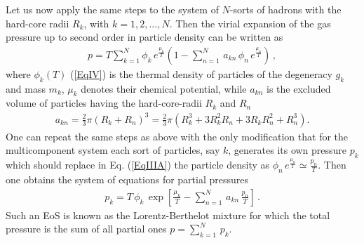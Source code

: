 \documentclass[12pt]{article}
\begin{document}
Let us  now apply the same steps  to the system of $N$-sorts  of  hadrons  with  the hard-core radii $R_k$, with $k = 1, 2, ..., N$. Then the virial expansion of the gas pressure  up to second order in particle density  can be written as
%
\begin{eqnarray}\label{EqIIIA}
%
p   =T \sum_{k=1}^{N} \phi_{k}\, e^{\frac{{\mu}_{k}}{T}}\left(1- \sum_{n=1}^{N}\, a_{kn }\,  \phi_{n} \, e^{\frac{{\mu}_{n}}{T}} \right) \,,
%
\end{eqnarray}
%
where  $\phi _k(T)$ (\ref{EqIV}) is  the thermal density of particles of the degeneracy $g_k$ and mass $m_k$,  $\mu_k$ denotes their  chemical potential,  while  
$a_{kn}$ is  the excluded volume of  particles  having the hard-core-radii $R_k$ and $R_n$
%
\begin{eqnarray}\label{EqIVA}
%
a_{kn}= \frac{2}{3} \pi \left(R_{k}+R_{n}\right)^{3}=\frac{2}{3}  \pi \left(R_{k}^{3}+3R_{k}^{2}R_{n}+3R_{k}R_{n}^{2}+R_{n}^{3} \right).
%
\end{eqnarray}
%
One can  repeat the same steps as above  with the only modification that
for the multicomponent system  each sort of particles, say $k$,  generates its own pressure $p_k$ which 
should replace  in Eq. (\ref{EqIIIA}) the particle density as $ \phi_{n} \, e^{\frac{{\mu}_{n}}{T}} \simeq \frac{p_n}{T}$. Then one obtains the system of  equations for partial pressures  
%
\begin{eqnarray}\label{EqVA}
%
p_k  =  T \,  \phi_{k}\, \exp \left[ \frac{{\mu}_{k}}{T} -  \sum_{n=1}^{N}\, a_{kn }\,  \frac{p_n}{T}  \right]  \,.
%
\end{eqnarray}
%
Such an EoS  is known as the Lorentz-Berthelot mixture  for which the total pressure is the sum of all partial ones $p = \sum_{k=1}^{N}\, p_k$.  
\end{document}

